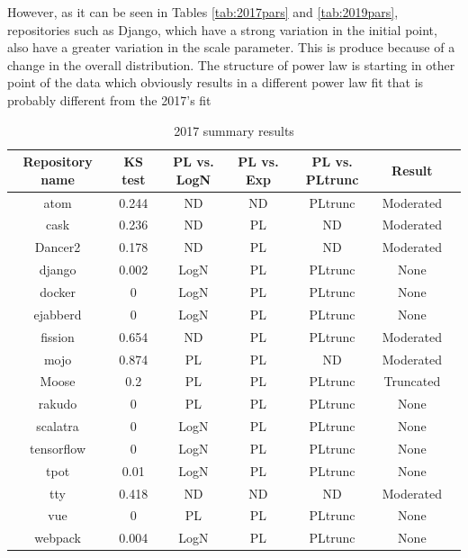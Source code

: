 \documentclass[conference]{IEEEtran}
\begin{document}
However, as it can be seen in Tables \ref{tab:2017pars} and
\ref{tab:2019pars}, repositories such as Django, which have a strong
variation in the initial point, also have a greater variation in the
scale parameter. This is produce because of a change in the overall
distribution. The structure of power law is starting in other point of
the data which obviously results in a different power law fit that is
probably different from the 2017's fit %
%
\begin{table}[h!tbp]
  \caption{2017 summary results}
  \begin{center}
    \begin{tabular}{| c |c| c | c| c |c | c |}
      \hline
      Repository name & KS test & PL vs. LogN & PL vs. Exp & PL vs. PLtrunc & Result \\ 
      \hline
      atom & 0.244 &ND & ND &PLtrunc & Moderated \\ 
      cask & 0.236 &ND & PL & ND & Moderated \\
      Dancer2 &0.178 &ND &PL &ND & Moderated \\
      django &0.002 &LogN &PL &PLtrunc &None\\
      docker &0 &LogN &PL &PLtrunc &None\\
      ejabberd &0 &LogN &PL &PLtrunc &None\\
      fission &0.654 &ND &PL &PLtrunc & Moderated\\
      mojo &0.874 &PL &PL &ND & Moderated \\
      Moose &0.2 &PL &PL &PLtrunc & Truncated\\
      rakudo &0 &PL &PL &PLtrunc & None\\
      scalatra &0 &LogN &PL &PLtrunc & None\\
      tensorflow &0 &LogN &PL &PLtrunc & None\\
      tpot &0.01 &LogN &PL &PLtrunc &None\\
      tty &0.418 &ND &ND &ND & Moderated \\
      vue &0 &PL &PL &PLtrunc & None\\
      webpack &0.004 &LogN &PL & PLtrunc & None\\
      \hline
    \end{tabular}
  \end{center}
  \label{tab:2017tests}
\end{table}
%
\end{document}
